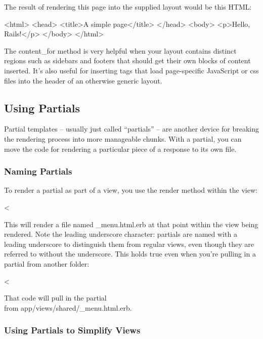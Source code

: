 \documentclass[10pt]{book}
\newenvironment{code}{%
  \scriptsize
    \verbatim
}{%
    \endverbatim
    \newline
}
\begin{document}
The result of rendering this page into the supplied layout would be this HTML:
\begin{code}
<html>
  <head>
  <title>A simple page</title>
  </head>
  <body>
  <p>Hello, Rails!</p>
  </body>
</html>
\end{code}

The content\_for method is very helpful when your layout  contains distinct regions such as sidebars and footers that should get  their own blocks of content inserted. It’s also useful for inserting  tags that load page-specific JavaScript or css files into the header of  an otherwise generic layout.

\subsection{ Using Partials}

Partial templates – usually just called “partials” – are another  device for breaking the rendering process into more manageable chunks.  With a partial, you can move the code for rendering a particular piece  of a response to its own file.

\subsubsection{ Naming Partials}

To render a partial as part of a view, you use the render method within the view:
\begin{code}
<%
\end{code}

This will render a file named \_menu.html.erb at that point  within the view being rendered. Note the leading underscore character:  partials are named with a leading underscore to distinguish them from  regular views, even though they are referred to without the underscore.  This holds true even when you’re pulling in a partial from another  folder:
\begin{code}
<%
\end{code}

That code will pull in the partial \\ from app/views/shared/\_menu.html.erb.

\subsubsection{ Using Partials to Simplify Views}
\end{document}
